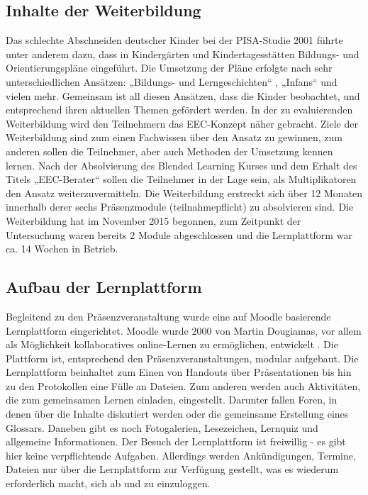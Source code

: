 \documentclass[12pt,smallheadings, bibliography=totoc]{scrartcl}
\begin{document}
\subsection{Inhalte der Weiterbildung}\label{inhalte-der-weiterbildung}

Das schlechte Abschneiden deutscher Kinder bei der PISA-Studie 2001
führte unter anderem dazu, dass in Kindergärten und Kindertagesstätten
Bildungs- und Orientierungspläne eingeführt. Die Umsetzung der Pläne
erfolgte nach sehr unterschiedlichen Ansätzen: „Bildungs- und
Lerngeschichten`` \parencite{leu2007bildungs}, „Infans``
\parencite{laewen2011infans} und vielen mehr. Gemeinsam ist all diesen
Ansätzen, dass die Kinder beobachtet, und entsprechend ihren aktuellen
Themen gefördert werden. In der zu evaluierenden Weiterbildung wird den
Teilnehmern das EEC-Konzept \parencite{hebenstreit2007early} näher
gebracht. Ziele der Weiterbildung sind zum einen Fachwissen über den
Ansatz zu gewinnen, zum anderen sollen die Teilnehmer, aber auch
Methoden der Umsetzung kennen lernen. Nach der Absolvierung des Blended
Learning Kurses und dem Erhalt des Titels „EEC-Berater`` sollen die
Teilnehmer in der Lage sein, als Multiplikatoren den Ansatz
weiterzuvermitteln. Die Weiterbildung erstreckt sich über 12 Monaten
innerhalb derer sechs Präsenzmodule (teilnahmepflicht) zu absolvieren
sind. Die Weiterbildung hat im November 2015 begonnen, zum Zeitpunkt der
Untersuchung waren bereits 2 Module abgeschlossen und die Lernplattform
war ca. 14 Wochen in Betrieb.

\subsection{Aufbau der Lernplattform}\label{aufbau-der-lernplattform}

Begleitend zu den Präsenzveranstaltung wurde eine auf Moodle basierende
Lernplattform eingerichtet. Moodle wurde 2000 von Martin Dougiamas, vor
allem als Möglichkeit kollaboratives online-Lernen zu ermöglichen,
entwickelt \parencite{dougiamas2002interpretive}. Die Plattform ist,
entsprechend den Präsenzveranstaltungen, modular aufgebaut. Die
Lernplattform beinhaltet zum Einen von Handouts über Präsentationen bis
hin zu den Protokollen eine Fülle an Dateien. Zum anderen werden auch
Aktivitäten, die zum gemeinsamen Lernen einladen, eingestellt. Darunter
fallen Foren, in denen über die Inhalte diskutiert werden oder die
gemeinsame Erstellung eines Glossars. Daneben gibt es noch Fotogalerien,
Lesezeichen, Lernquiz und allgemeine Informationen. Der Besuch der
Lernplattform ist freiwillig - es gibt hier keine verpflichtende
Aufgaben. Allerdings werden Ankündigungen, Termine, Dateien nur über die
Lernplattform zur Verfügung gestellt, was es wiederum erforderlich
macht, sich ab und zu einzuloggen.
\end{document}
